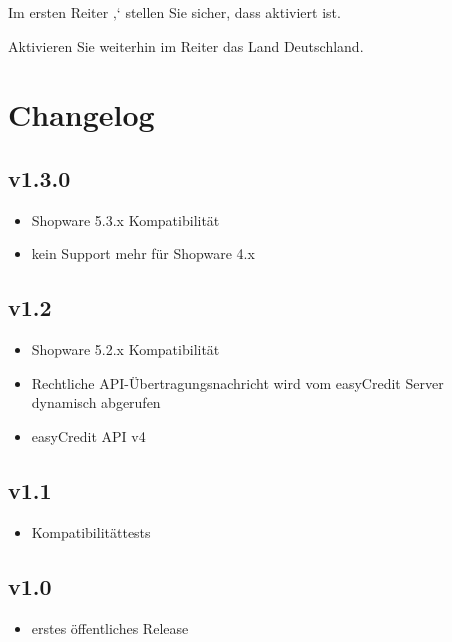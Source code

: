 \documentclass[a4paper,10pt,openany,oneside,ngerman]{sphinxmanual}
\begin{document}
Im ersten Reiter ‚‘ stellen Sie sicher, dass  aktiviert ist.

\noindent{}

\clearpage

Aktivieren Sie weiterhin im Reiter  das Land Deutschland.

\noindent{}


\chapter{Changelog}
\label{\detokenize{changelog::doc}}\label{\detokenize{changelog:changelog}}

\section{v1.3.0}
\label{\detokenize{changelog:v1-3-0}}\begin{itemize}
\item {} 
Shopware 5.3.x Kompatibilität

\item {} 
kein Support mehr für Shopware 4.x

\end{itemize}


\section{v1.2}
\label{\detokenize{changelog:v1-2}}\begin{itemize}
\item {} 
Shopware 5.2.x Kompatibilität

\item {} 
Rechtliche API-Übertragungsnachricht wird vom easyCredit Server dynamisch abgerufen

\item {} 
easyCredit API v4

\end{itemize}


\section{v1.1}
\label{\detokenize{changelog:v1-1}}\begin{itemize}
\item {} 
Kompatibilitättests

\end{itemize}


\section{v1.0}
\label{\detokenize{changelog:v1-0}}\begin{itemize}
\item {} 
erstes öffentliches Release

\end{itemize}



\renewcommand{\indexname}{Stichwortverzeichnis}
\footnotesize\raggedright\printindex
\end{document}
